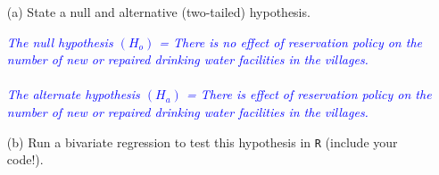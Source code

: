 \documentclass[12pt,letterpaper]{article}
\begin{document}
\begin{enumerate}
	\item [(a)] State a null and alternative (two-tailed) hypothesis. 

\vspace{0.2cm}

\textcolor{blue}{
\textit{The null hypothesis $(H_o)$ = There is no effect of reservation policy on the number of new or repaired drinking water facilities in the villages.\\
\\
The alternate hypothesis $(H_a)$ = There is effect of reservation policy on the number of new or repaired drinking water facilities in the villages.}
}
	
	\vspace{0.5cm}
	\item [(b)] Run a bivariate regression to test this hypothesis in \texttt{R} (include your code!).


\end{enumerate}
\end{document}
